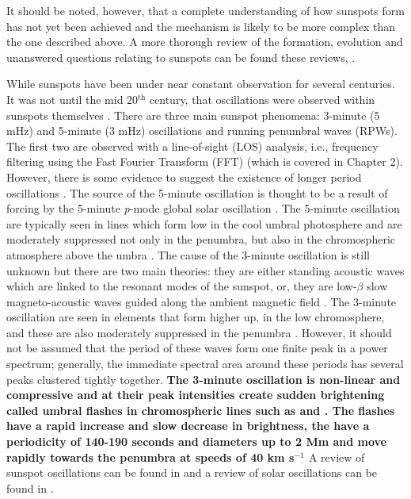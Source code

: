     It should be noted, however, that a complete understanding of how sunspots form has not yet been achieved and the mechanism is likely to be more complex than the one described above.
    A more thorough review of the formation, evolution and unanswered questions relating to sunspots can be found these reviews, \cite{SAO,2008sust.book.....T,lrsp-2011-3}.

    While sunspots have been under near constant observation for several centuries.
    It was not until the mid 20$^{\mathrm{th}}$ century, that oscillations were observed within sunspots themselves \citep{OASO}.
    There are three main sunspot phenomena: 3-minute (5 mHz) and 5-minute (3 mHz) oscillations and running penumbral waves (RPWs).
    The first two are observed with a line-of-sight (LOS) analysis, i.e., frequency filtering using the Fast Fourier Transform (FFT) (which is covered in Chapter 2).
    However, there is some evidence to suggest the existence of longer period oscillations \citep{LPO,SOS,Chorley2011}.
    The source of the 5-minute oscillation is thought to be a result of forcing by the 5-minute \textit{p}-mode global solar oscillation \citep{OWS,WAUO}.
    The 5-minute oscillation are typically seen in lines which form low in the cool umbral photosphere and are moderately suppressed not only in the penumbra, but also in the chromospheric atmosphere above the umbra \citep{OASO}.
    The cause of the 3-minute oscillation is still unknown but there are two main theories: they are either standing acoustic waves which are linked to the resonant modes of the sunspot, or, they are low-$\beta$ slow magneto-acoustic waves guided along the ambient magnetic field \citep{UTMO,OWS,OASO,ORWS}.
    The 3-minute oscillation are seen in elements that form higher up, in the low chromosphere, and these are also moderately suppressed in the penumbra \citep{OASO}.
    However, it should not be assumed that the period of these waves form one finite peak in a power spectrum; generally, the immediate spectral area around these periods has several peaks clustered tightly together.
	\textbf{The 3-minute oscillation is non-linear and compressive and at their peak intensities create sudden brightening called umbral flashes in chromospheric lines such as  and  \citep{1969SoPh....7..351B}.
    The flashes have a rapid increase and slow decrease in brightness, the have a periodicity of 140-190 seconds and diameters up to 2 Mm and move rapidly towards the penumbra at speeds of 40 km s$^{-1}$ \citep{2003A&A...403..277R}}
    A review of sunspot oscillations can be found in \cite{OASO} and a review of solar oscillations can be found in \cite{SO}.
    
